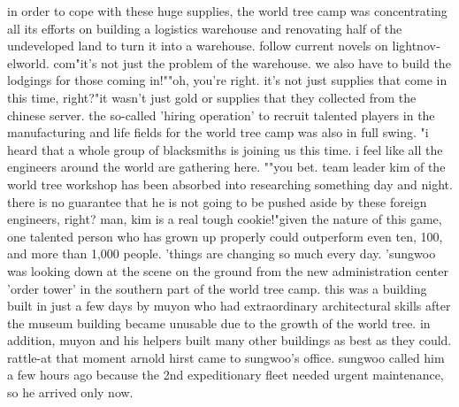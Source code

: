 in order to cope with these huge supplies, the world tree camp was concentrating all its efforts on building a logistics warehouse and renovating half of the undeveloped land to turn it into a warehouse.
follow current novels on lightnov­elworld.
com"it's not just the problem of the warehouse.
 we also have to build the lodgings for those coming in!""oh, you're right.
 it's not just supplies that come in this time, right?"it wasn't just gold or supplies that they collected from the chinese server.
the so-called 'hiring operation' to recruit talented players in the manufacturing and life fields for the world tree camp was also in full swing.
"i heard that a whole group of blacksmiths is joining us this time.
 i feel like all the engineers around the world are gathering here.
""you bet.
 team leader kim of the world tree workshop has been absorbed into researching something day and night.
 there is no guarantee that he is not going to be pushed aside by these foreign engineers, right? man, kim is a real tough cookie!"given the nature of this game, one talented person who has grown up properly could outperform even ten, 100, and more than 1,000 people.
'things are changing so much every day.
'sungwoo was looking down at the scene on the ground from the new administration center 'order tower' in the southern part of the world tree camp.
this was a building built in just a few days by muyon who had extraordinary architectural skills after the museum building became unusable due to the growth of the world tree.
 in addition, muyon and his helpers built many other buildings as best as they could.
rattle-at that moment arnold hirst came to sungwoo's office.
 sungwoo called him a few hours ago because the 2nd expeditionary fleet needed urgent maintenance, so he arrived only now.
 
